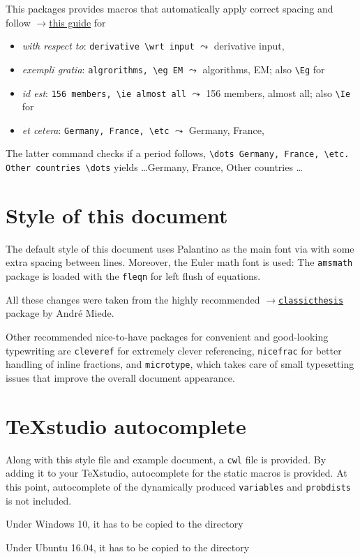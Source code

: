 \documentclass
[
twoside, %
]
{article}
\begin{document}
This packages provides macros that automatically apply correct spacing and follow \href{http://www.quickanddirtytips.com/education/grammar/ie-versus-eg?page=2}{$\rightarrow$this guide} for 
\begin{itemize}
	\item \emph{with respect to}: \texttt{derivative \textbackslash wrt input} $\leadsto$ derivative \wrt input,
	\item \emph{exempli gratia}: \texttt{algrorithms, \textbackslash eg EM} $\leadsto$ algorithms, \eg EM; also \texttt{\textbackslash Eg} for \Eg
	\item \emph{id est}: \texttt{156 members, \textbackslash ie almost all} $\leadsto$ 156 members, \ie almost all; also \texttt{\textbackslash Ie} for \Ie
	\item \emph{et cetera}: \texttt{Germany, France, \textbackslash etc} $\leadsto$ Germany, France, \etc
\end{itemize}
The latter command checks if a period follows, \ie \texttt{\textbackslash dots Germany, France, \textbackslash etc. Other countries \textbackslash dots} yields \dots Germany, France, \etc Other countries \dots

\section{Style of this document}
The default style of this document uses Palantino as the main font via  with some extra spacing between lines. Moreover, the Euler math font is used:  The \texttt{amsmath} package is loaded with the \texttt{fleqn} for left flush of equations. 

All these changes were taken from the highly recommended \href{https://bitbucket.org/amiede/classicthesis/wiki/Home}{$\rightarrow$\texttt{classicthesis}} package by Andr\'e Miede.

Other recommended nice-to-have packages for convenient and good-looking typewriting are \texttt{cleveref} for extremely clever referencing, \texttt{nicefrac} for better handling of inline fractions, and \texttt{microtype}, which takes care of small typesetting issues that improve the overall document appearance.

\section{\TeX studio autocomplete}
Along with this style file and example document, a \texttt{cwl} file is provided. By adding it to your \TeX studio, autocomplete for the static macros is provided. At this point, autocomplete of the dynamically produced \texttt{variables} and \texttt{probdists} is not included.

Under Windows 10, it has to be copied to the directory  

Under Ubuntu 16.04, it has to be copied to the directory  
\end{document}
